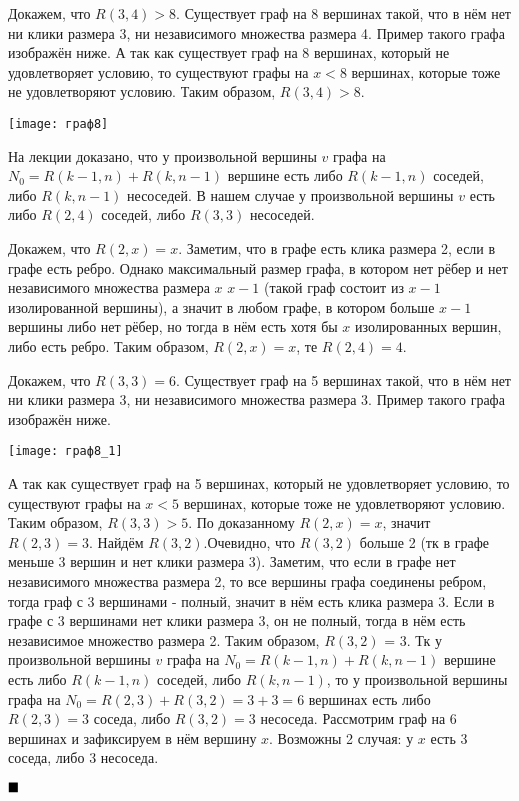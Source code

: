 \documentclass[a4paper, 16pt]{article}
\newenvironment{proof}[1][Доказательство]{%
	\begin{trivlist}
		\item[\hskip \labelsep {\bfseries #1:}]
		\item \hspace{14pt}
	}{
		$ \hfill\blacksquare $
	\end{trivlist}
	\hfill\break
}
\begin{document}
	\begin{proof}
		Докажем, что $R(3,4) > 8$. Существует граф на 8 вершинах такой, что в нём нет ни клики размера 3, ни независимого множества размера 4. Пример такого графа изображён ниже. А так как существует граф на 8 вершинах,  который не удовлетворяет условию, то существуют графы на $x<8$ вершинах, которые тоже не удовлетворяют условию. Таким образом, $R(3,4) > 8$.
		
		\texttt{[image: граф8]}
		
		На лекции доказано, что у произвольной вершины $v$ графа на $N_0=R(k-1, n) + R(k, n-1)$ вершине есть либо $R(k-1, n)$ соседей, либо $R(k,n-1)$ несоседей. В нашем случае у произвольной вершины $v$ есть либо $R(2,4)$ соседей, либо $R(3,3)$ несоседей. 
		
		Докажем, что $R(2, x) = x$. Заметим, что в графе есть клика размера 2, если в графе есть ребро. Однако максимальный размер графа, в котором нет рёбер и нет независимого множества размера $x$  $x-1$ (такой граф состоит из  $x-1$ изолированной вершины), а значит в любом графе, в котором больше $x-1$ вершины либо нет рёбер, но тогда в нём есть хотя бы $x$ изолированных вершин, либо есть ребро. Таким образом, $R(2, x) = x$, те $R(2, 4) = 4$.
		
			Докажем, что $R(3,3) = 6$. Существует граф на 5 вершинах такой, что в нём нет ни клики размера 3, ни независимого множества размера 3. Пример такого графа изображён ниже.
			
					\texttt{[image: граф8\_1]}
			
			 А так как существует граф на 5 вершинах,  который не удовлетворяет условию, то существуют графы на $x<5$ вершинах, которые тоже не удовлетворяют условию. Таким образом, $R(3,3) > 5$. По доказанному $R(2, x) = x$, значит $R(2,3) = 3$. Найдём $R(3, 2)$.Очевидно, что $R(3, 2)$ больше 2 (тк в графе меньше 3 вершин и нет клики размера 3). Заметим, что если в графе нет независимого множества размера 2, то все вершины графа соединены ребром, тогда граф с 3 вершинами - полный, значит в нём есть клика размера 3. Если в графе с 3 вершинами нет клики размера 3, он не полный, тогда в нём есть независимое множество размера 2. Таким образом, $R(3, 2)$ = 3. Тк у произвольной вершины $v$ графа на $N_0=R(k-1, n) + R(k, n-1)$ вершине есть либо $R(k-1, n)$ соседей, либо $R(k,n-1)$, то у произвольной вершины графа на $N_0=R(2, 3) + R(3, 2) = 3 + 3 = 6$ вершинах есть либо $R(2, 3) = 3$ соседа, либо $R(3,2)=3$ несоседа. Рассмотрим граф на 6 вершинах и зафиксируем в нём вершину $x$. Возможны 2 случая: у $x$ есть 3 соседа, либо 3 несоседа.
			

\end{proof}
\end{document}
